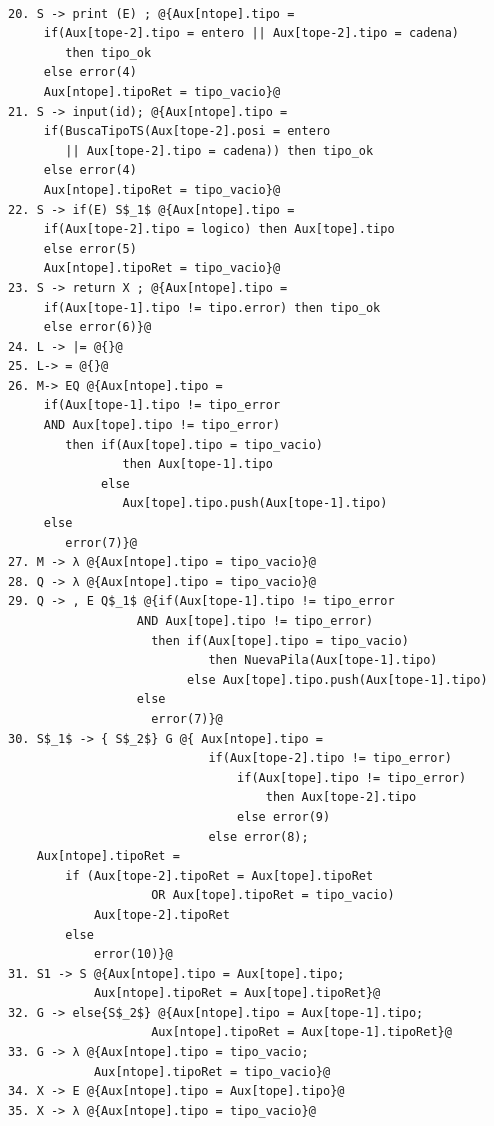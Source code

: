 \begin{lstlisting}[style=EdT]
     
20. S -> print (E) ; @{Aux[ntope].tipo =
     if(Aux[tope-2].tipo = entero || Aux[tope-2].tipo = cadena)
        then tipo_ok
     else error(4)
     Aux[ntope].tipoRet = tipo_vacio}@
21. S -> input(id); @{Aux[ntope].tipo =
     if(BuscaTipoTS(Aux[tope-2].posi = entero
        || Aux[tope-2].tipo = cadena)) then tipo_ok
     else error(4)
     Aux[ntope].tipoRet = tipo_vacio}@
22. S -> if(E) S$_1$ @{Aux[ntope].tipo =
     if(Aux[tope-2].tipo = logico) then Aux[tope].tipo
     else error(5)
     Aux[ntope].tipoRet = tipo_vacio}@
23. S -> return X ; @{Aux[ntope].tipo =
     if(Aux[tope-1].tipo != tipo.error) then tipo_ok
     else error(6)}@
24. L -> |= @{}@
25. L-> = @{}@
26. M-> EQ @{Aux[ntope].tipo =
     if(Aux[tope-1].tipo != tipo_error
     AND Aux[tope].tipo != tipo_error)
        then if(Aux[tope].tipo = tipo_vacio)
                then Aux[tope-1].tipo
             else
                Aux[tope].tipo.push(Aux[tope-1].tipo)
     else
        error(7)}@
27. M -> λ @{Aux[ntope].tipo = tipo_vacio}@
28. Q -> λ @{Aux[ntope].tipo = tipo_vacio}@
29. Q -> , E Q$_1$ @{if(Aux[tope-1].tipo != tipo_error
                  AND Aux[tope].tipo != tipo_error)
                    then if(Aux[tope].tipo = tipo_vacio)
                            then NuevaPila(Aux[tope-1].tipo)
                         else Aux[tope].tipo.push(Aux[tope-1].tipo)
                  else
                    error(7)}@
30. S$_1$ -> { S$_2$} G @{ Aux[ntope].tipo =
                            if(Aux[tope-2].tipo != tipo_error)
                                if(Aux[tope].tipo != tipo_error)
                                    then Aux[tope-2].tipo
                                else error(9)
                            else error(8);
	Aux[ntope].tipoRet =
		if (Aux[tope-2].tipoRet = Aux[tope].tipoRet 
					OR Aux[tope].tipoRet = tipo_vacio)
			Aux[tope-2].tipoRet
		else 
			error(10)}@
31. S1 -> S @{Aux[ntope].tipo = Aux[tope].tipo;
			Aux[ntope].tipoRet = Aux[tope].tipoRet}@
32. G -> else{S$_2$} @{Aux[ntope].tipo = Aux[tope-1].tipo;
					Aux[ntope].tipoRet = Aux[tope-1].tipoRet}@
33. G -> λ @{Aux[ntope].tipo = tipo_vacio;
			Aux[ntope].tipoRet = tipo_vacio}@
34. X -> E @{Aux[ntope].tipo = Aux[tope].tipo}@
35. X -> λ @{Aux[ntope].tipo = tipo_vacio}@


\end{lstlisting}
